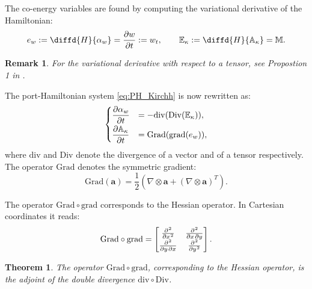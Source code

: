 \documentclass[preprint,12pt]{elsarticle}
\newtheorem{theorem}{Theorem}
\newtheorem{remark}{Remark}
\newcommand{\revOne}[1]{\textcolor{blue!80!black}{#1}}
\begin{document}
The co-energy variables are found by computing the variational derivative of the Hamiltonian:
\begin{equation}
e_w := \diffd{H}{\alpha_w} = \diffp{w}{t} := w_t,  \qquad  \mathbb{E}_{\kappa} := \diffd{H}{\mathbb{A}_{\kappa}} = \mathbb{M}.
\end{equation}
\begin{remark}
For the variational derivative with respect to a tensor, see Propostion 1 in \cite{BrugnoliMin}.
\end{remark}
The port-Hamiltonian system \revOne{\eqref{eq:PH_Kirchh} is now rewritten as:}
\begin{equation}
\label{eq:PH_sys_Kir_Ten_pr}
\begin{cases}
\displaystyle\diffp{\alpha_w}{t} &= - \mathrm{div}(\mathrm{Div}(\mathbb{E}_{\kappa})), \vspace{1mm} \\
\displaystyle\diffp{\mathbb{A}_{\kappa}}{t} &= \mathrm{Grad}(\mathrm{grad}(e_w)),
\end{cases}
\end{equation}
where $\mathrm{div}$ and $\mathrm{Div}$ denote the divergence of a vector and of a tensor respectively. The operator $\mathrm{Grad}$ denotes the symmetric gradient:
\begin{equation}
\mathrm{Grad}(\bm{a}) =  \frac{1}{2} \left(\nabla \otimes \bm{a} + \left(\nabla \otimes \bm{a}\right)^T \right).
\end{equation}

The operator $\mathrm{Grad} \circ \mathrm{grad}$ corresponds to the Hessian operator. In Cartesian coordinates it reads:
\begin{equation}
\mathrm{Grad} \circ \mathrm{grad} = 
\begin{bmatrix}
\diffp[2]{}{x}  &  \diffp{}{x,y} \\
\diffp{}{y,x}   &  \diffp[2]{}{y} \\
\end{bmatrix}.
\end{equation}

\begin{theorem}
The operator $\mathrm{Grad} \circ \mathrm{grad}$, corresponding to the Hessian operator, is the adjoint of the double divergence $\mathrm{div} \circ \mathrm{Div}$.
\end{theorem}
\end{document}
